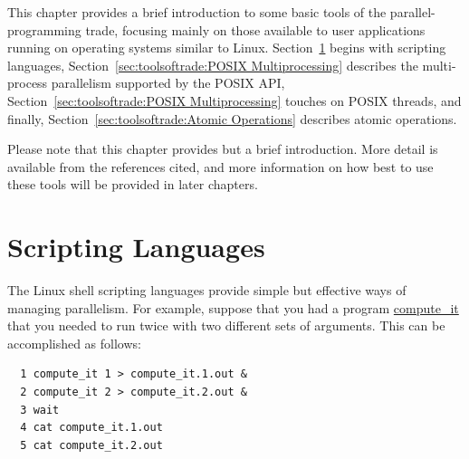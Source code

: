 

This chapter provides a brief introduction to some basic tools of the
parallel-programming trade, focusing mainly on those available to
user applications running on operating systems similar to Linux.
Section~\ref{sec:toolsoftrade:Scripting Languages} begins with
scripting languages,
Section~\ref{sec:toolsoftrade:POSIX Multiprocessing}
describes the multi-process parallelism supported by the POSIX API,
Section~\ref{sec:toolsoftrade:POSIX Multiprocessing} touches on POSIX threads,
and finally,
Section~\ref{sec:toolsoftrade:Atomic Operations}
describes atomic operations.

Please note that this chapter provides but a brief introduction.
More detail is available from the references cited, and more information
on how best to use these tools will be provided in later chapters.

\section{Scripting Languages}
\label{sec:toolsoftrade:Scripting Languages}

The Linux shell scripting languages provide simple but effective ways
of managing parallelism.
For example, suppose that you had a program \url{compute_it}
that you needed to run twice with two different sets of arguments.
This can be accomplished as follows:

\vspace{5pt}
\begin{minipage}[t]{\columnwidth}
\begin{verbatim}
  1 compute_it 1 > compute_it.1.out &
  2 compute_it 2 > compute_it.2.out &
  3 wait
  4 cat compute_it.1.out
  5 cat compute_it.2.out
\end{verbatim}
\end{minipage}
\vspace{5pt}


